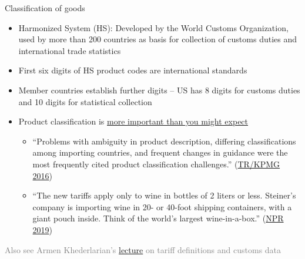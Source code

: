 \documentclass[11pt,notes=hide,aspectratio=169]{beamer}
\begin{document}
\begin{frame}{Classification of goods}
\begin{itemize}
\item Harmonized System (HS): Developed by the World Customs Organization, used by more than 200 countries as basis for collection of customs duties and international trade statistics
\item First six digits of HS product codes are international standards
\item Member countries establish further digits -- US has 8 digits for customs duties and 10 digits for statistical collection
\item Product classification is \href{https://tax.thomsonreuters.com/blog/onesource/classification-of-goods-and-compliance-requirements-in-india-international-trade/}{more important than you might expect}
\begin{itemize}
\item {\footnotesize ``Problems with ambiguity in product description, differing classifications among importing countries, and frequent changes in guidance were the most frequently cited product classification challenges.'' (\href{https://tax.thomsonreuters.com/site/wp-content/private/pdf/gtm/gtm-survey-report-2016.pdf}{TR/KPMG 2016})\par}
\item {\footnotesize ``The new tariffs apply only to wine in bottles of 2 liters or less. Steiner's company is importing wine in 20- or 40-foot shipping containers, with a giant pouch inside. Think of the world's largest wine-in-a-box.'' (\href{https://www.npr.org/2019/10/25/773380390/where-theres-a-wine-there-s-a-way}{NPR 2019})\par}
\end{itemize}
\end{itemize}
\textcolor{gray}{\small Also see Armen Khederlarian's \href{https://github.com/akhederlarian/trade-phd/tree/main/notes}{lecture} on tariff definitions and customs data}
\end{frame}
\end{document}
